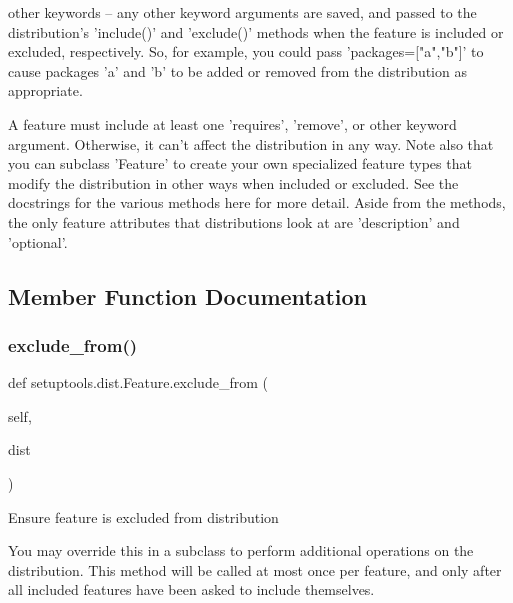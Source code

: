 \begin{DoxyVerb}
  other keywords -- any other keyword arguments are saved, and passed to
     the distribution's 'include()' and 'exclude()' methods when the
     feature is included or excluded, respectively.  So, for example, you
     could pass 'packages=["a","b"]' to cause packages 'a' and 'b' to be
     added or removed from the distribution as appropriate.

A feature must include at least one 'requires', 'remove', or other
keyword argument.  Otherwise, it can't affect the distribution in any way.
Note also that you can subclass 'Feature' to create your own specialized
feature types that modify the distribution in other ways when included or
excluded.  See the docstrings for the various methods here for more detail.
Aside from the methods, the only feature attributes that distributions look
at are 'description' and 'optional'.
\end{DoxyVerb}
 

\subsection{Member Function Documentation}
\mbox{\label{classsetuptools_1_1dist_1_1_feature_aa7bf364cf012b0da64fa1a6c54af8930}} 
\subsubsection{\texorpdfstring{exclude\+\_\+from()}{exclude\_from()}}
{\footnotesize\ttfamily def setuptools.\+dist.\+Feature.\+exclude\+\_\+from (\begin{DoxyParamCaption}\item[{}]{self,  }\item[{}]{dist }\end{DoxyParamCaption})}

\begin{DoxyVerb}Ensure feature is excluded from distribution

You may override this in a subclass to perform additional operations on
the distribution.  This method will be called at most once per
feature, and only after all included features have been asked to
include themselves.
\end{DoxyVerb}
 \mbox{\label{classsetuptools_1_1dist_1_1_feature_ac3896cc19837e04ab7b51a01368c9c7a}} 
